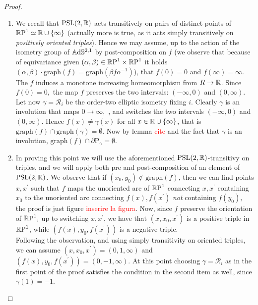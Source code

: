 \begin{proof}
    \begin{enumerate}
        \item We recall that $\PSL$ acts transitively on pairs of distinct points of $\R\text{P}^1\simeq\R\cup\{\infty\}$ (actually more is true, as it acts simply transitively on \textit{positively oriented triples}). Hence we may assume, up to the action of the isometry group of $\A^{2,1}$ by post-composition on $f$ (we observe that because of equivariance given $(\alpha,\beta)\in\T$ it holds $(\alpha,\beta)\cdot\text{graph}(f)=\text{graph}(\beta f\alpha^{-1})$), that $f(0)=0$ and $f(\infty)=\infty.$ The $f$ induces a monotone increasing homeomorphism from $R\to\R$. Since $f(0)=0,$ the map $f$ preserves the two intervals: $(-\infty,0)$ and $(0,\infty).$ Let now $\gamma=\mathcal{R}_i$ be the order-two elliptic isometry fixing $i$. Clearly $\gamma$ is an involution that maps $0\to\infty,$ , and switches the two intervals $(-\infty,0)$ and $(0,\infty)$. Hence $f(x)\neq\gamma(x)$ for all $x\in\R\cup\{\infty\}$, that is $\text{graph}(f)\cap\text{graph}(\gamma)=\emptyset.$ Now by lemma \textcolor{red}{cite} and the fact that $\gamma$ is an involution, $\text{graph}(f)\cap\partial\text{P}_\gamma=\emptyset.$
        \item In proving this point we will use the aforementioned $\PSL$-transitivy on triples, and we will apply both pre and post-composition of an element of $\PSL$. We observe that if $(x_0,y_0)\notin\text{graph}(f)$, then we can find points $x,x^{\prime}$ such that $f$ maps the unoriented arc of $\R\text{P}^1$ connecting $x,x^{\prime}$ containing $x_0$ to the unoriented arc connecting $f(x),f(x^{\prime})$ \textit{not} containing $f(y_0),$ the proof is just figure \textcolor{red}{inserire la figura}. Now, since $f$ preserve the orientation of $\R\text{P}^1,$ up to switching $x,x^{\prime}$, we have that $(x, x_0, x^{\prime})$ is a positive triple in $\S$, while $(f(x),y_0,f(x^{\prime}))$ is a negative triple. \\
        Following the observation, and using simply transitivity on oriented triples, we can assume $(x,x_0,x^{\prime})=(0,1,\infty)$ and $(f(x),y_0,f(x^{\prime}))=(0,-1,\infty).$ At this point choosing $\gamma=\mathcal{R}_i$ as in the first point of the proof satisfies the condition in the second item as well, since $\gamma(1)=-1$.  
    \end{enumerate}
\end{proof}

